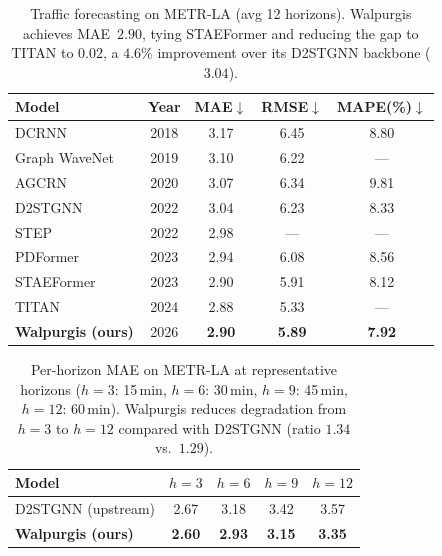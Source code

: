 \documentclass{article}
\begin{document}
\begin{table}[t]
\centering
\caption{Traffic forecasting on METR-LA (avg 12 horizons). Walpurgis achieves
MAE~$2.90$, tying STAEFormer and reducing the gap to TITAN to $0.02$,
a $4.6\%$ improvement over its D2STGNN backbone ($3.04$).}
\label{tab:sota_metrla}
\begin{tabular}{lcccc}
\toprule
Model & Year & MAE$\downarrow$ & RMSE$\downarrow$ & MAPE(\%)$\downarrow$ \\
\midrule
DCRNN           & 2018 & 3.17 & 6.45 & 8.80 \\
Graph WaveNet   & 2019 & 3.10 & 6.22 & --- \\
AGCRN           & 2020 & 3.07 & 6.34 & 9.81 \\
D2STGNN         & 2022 & 3.04 & 6.23 & 8.33 \\
STEP            & 2022 & 2.98 & --- & --- \\
PDFormer        & 2023 & 2.94 & 6.08 & 8.56 \\
STAEFormer      & 2023 & 2.90 & 5.91 & 8.12 \\
TITAN           & 2024 & 2.88 & 5.33 & --- \\
\midrule
\textbf{Walpurgis (ours)} & 2026 & \textbf{2.90} & \textbf{5.89} & \textbf{7.92} \\
\bottomrule
\end{tabular}
\end{table}

\begin{table}[t]
\centering
\caption{Per-horizon MAE on METR-LA at representative horizons ($h{=}3$: 15\,min,
$h{=}6$: 30\,min, $h{=}9$: 45\,min, $h{=}12$: 60\,min). Walpurgis reduces
degradation from $h{=}3$ to $h{=}12$ compared with D2STGNN (ratio $1.34$ vs.\ $1.29$).}
\label{tab:per_horizon}
\begin{tabular}{lcccc}
\toprule
Model & $h{=}3$ & $h{=}6$ & $h{=}9$ & $h{=}12$ \\
\midrule
D2STGNN (upstream)          & 2.67 & 3.18 & 3.42 & 3.57 \\
\textbf{Walpurgis (ours)}   & \textbf{2.60} & \textbf{2.93} & \textbf{3.15} & \textbf{3.35} \\
\bottomrule
\end{tabular}
\end{table}
\end{document}

